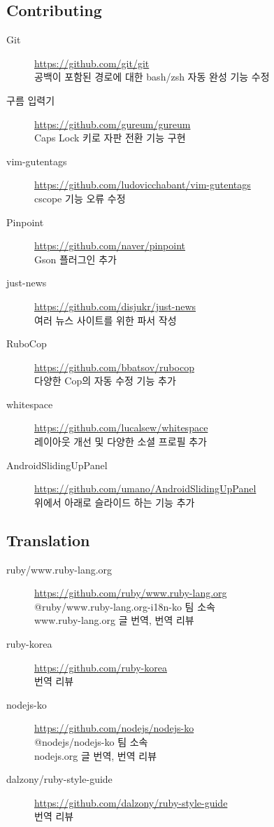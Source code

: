 \documentclass[a4paper,10pt]{article}
\begin{document}
\subsection{Contributing}
\begin{description}
  \item[Git] \url{https://github.com/git/git} \\
    공백이 포함된 경로에 대한 bash/zsh 자동 완성 기능 수정
  \item[구름 입력기] \url{https://github.com/gureum/gureum} \\
    Caps Lock 키로 자판 전환 기능 구현
  \item[vim-gutentags] \url{https://github.com/ludovicchabant/vim-gutentags} \\
    cscope 기능 오류 수정
  \item[Pinpoint] \url{https://github.com/naver/pinpoint} \\
    Gson 플러그인 추가
  \item[just-news] \url{https://github.com/disjukr/just-news} \\
    여러 뉴스 사이트를 위한 파서 작성
  \item[RuboCop] \url{https://github.com/bbatsov/rubocop} \\
    다양한 Cop의 자동 수정 기능 추가
  \item[whitespace] \url{https://github.com/lucalsew/whitespace} \\
    레이아웃 개선 및 다양한 소셜 프로필 추가
  \item[AndroidSlidingUpPanel] \url{https://github.com/umano/AndroidSlidingUpPanel} \\
    위에서 아래로 슬라이드 하는 기능 추가
\end{description}

\subsection{Translation}
\begin{description}
  \item[ruby/www.ruby-lang.org] \url{https://github.com/ruby/www.ruby-lang.org} \\
    @ruby/www.ruby-lang.org-i18n-ko 팀 소속 \\
    www.ruby-lang.org 글 번역, 번역 리뷰
  \item[ruby-korea] \url{https://github.com/ruby-korea} \\
    번역 리뷰
  \item[nodejs-ko] \url{https://github.com/nodejs/nodejs-ko} \\
    @nodejs/nodejs-ko 팀 소속 \\
    nodejs.org 글 번역, 번역 리뷰
  \item[dalzony/ruby-style-guide] \url{https://github.com/dalzony/ruby-style-guide} \\
    번역 리뷰
\end{description}


\end{document}
